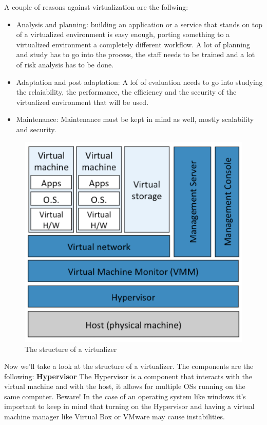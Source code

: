 A couple of reasons against virtualization are the follwing:
\begin{itemize}
    \item Analysis and planning: building an application or a service that stands on top of a virtualized environment is easy enough, porting something to a virtualized environment a completely different workflow. A lot of planning and study has to go into the process, the staff needs to be trained and a lot of risk analysis has to be done.
    \item Adaptation and post adaptation: A lof of evaluation needs to go into studying the relaiability, the performance, the efficiency and the security of the virtualized environment that will be used.
    \item Maintenance: Maintenance must be kept in mind as well, mostly scalability and security.
\end{itemize}
\begin{figure}
    \centering
    \includegraphics[scale=0.4]{img/virtualization_components.png}
    \caption{The structure of a virtualizer}
\end{figure}
Now we'll take a look at the structure of a virtualizer. \n
The components are the following: \n
\smallSpace
\textbf{Hypervisor} \n
The Hypervisor is a component that interacts with the virtual machine and with the host, it allows for multiple OSs running on the same computer. Beware! In the case of an operating system like windows it's important to keep in mind that turning on the Hypervisor and having a virtual machine manager like Virtual Box or VMware may cause instabilities. \n
